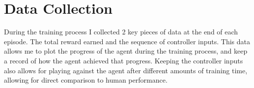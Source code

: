 \section{Data Collection}
During the training process I collected 2 key pieces of data at the end of each episode. The total reward earned and the sequence of controller inputs. This data allows me to plot the progress of the agent during the training process, and keep a record of how the agent achieved that progress. Keeping the controller inputs also allows for playing against the agent after different amounts of training time, allowing for direct comparison to human performance.